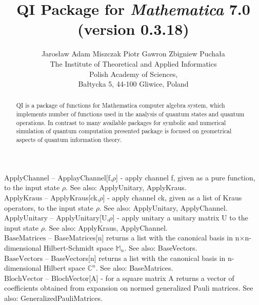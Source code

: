 \documentclass[a4paper,10pt]{scrartcl}
\begin{document}
	\title{QI Package for \emph{Mathematica} 7.0 \\(version 0.3.18)}\author{Jaros{\l}aw Adam Miszczak \quad Piotr Gawron \quad Zbigniew Pucha{\l}a\\
	{The Institute of Theoretical and Applied Informatics}\\
	{Polish Academy of Sciences},\\
	{Ba{\l}tycka 5, 44-100 Gliwice, Poland}}
	\maketitle
	\begin{abstract}QI is a package of functions for Mathematica computer algebra system, which implements 
number of functions used in the analysis of quantum states and quantum operations. In contrast to 
many available packages for symbolic and numerical simulation of quantum computation presented 
package is focused on geometrical aspects of quantum information theory.\end{abstract}
	\textbf{$ \text{ApplyChannel} $ }-- ApplayChannel[f,$\rho $] - apply channel f, given as a pure function, to the input state $\rho $. See also: ApplyUnitary, ApplyKraus.$  $\\

\textbf{$ \text{ApplyKraus} $ }-- ApplyKraus[ck,$\rho $] - apply channel ck, given as a list of Kraus operators, to the input state $\rho $. See also: ApplyUnitary, ApplyChannel.$  $\\

\textbf{$ \text{ApplyUnitary} $ }-- ApplyUnitary[U,$\rho $] - apply unitary a unitary matrix U to the input state $\rho $. See also: ApplyKraus, ApplyChannel.$  $\\

\textbf{$ \text{BaseMatrices} $ }-- BaseMatrices[n] returns a list with the canonical basis in n$\times $n-dimensional Hilbert-Schmidt space $ \mathbb{M}_n $. See also: BaseVectors.$  $\\

\textbf{$ \text{BaseVectors} $ }-- BaseVectors[n] returns a list with the canonical basis in n-dimensional Hilbert space $ \mathbb{C}^n $. See also: BaseMatrices.$  $\\

\textbf{$ \text{BlochVector} $ }-- BlochVector[A] - for a square matrix A returns a vector of coefficients obtained from expansion on normed generalized Pauli matrices. See also: GeneralizedPauliMatrices.$  $\\
\end{document}
